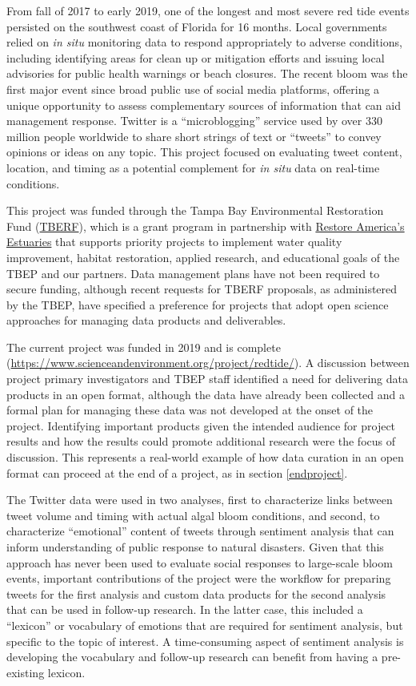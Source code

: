 \documentclass[
]{book}
\begin{document}
From fall of 2017 to early 2019, one of the longest and most severe red tide events persisted on the southwest coast of Florida for 16 months. Local governments relied on \emph{in situ} monitoring data to respond appropriately to adverse conditions, including identifying areas for clean up or mitigation efforts and issuing local advisories for public health warnings or beach closures. The recent bloom was the first major event since broad public use of social media platforms, offering a unique opportunity to assess complementary sources of information that can aid management response. Twitter is a ``microblogging'' service used by over 330 million people worldwide to share short strings of text or ``tweets'' to convey opinions or ideas on any topic. This project focused on evaluating tweet content, location, and timing as a potential complement for \emph{in situ} data on real-time conditions.

This project was funded through the Tampa Bay Environmental Restoration Fund (\href{https://tbep.org/our-work/restoration-research/tberf/}{TBERF}), which is a grant program in partnership with \href{https://estuaries.org/}{Restore America's Estuaries} that supports priority projects to implement water quality improvement, habitat restoration, applied research, and educational goals of the TBEP and our partners. Data management plans have not been required to secure funding, although recent requests for TBERF proposals, as administered by the TBEP, have specified a preference for projects that adopt open science approaches for managing data products and deliverables.

The current project was funded in 2019 and is complete (\url{https://www.scienceandenvironment.org/project/redtide/}). A discussion between project primary investigators and TBEP staff identified a need for delivering data products in an open format, although the data have already been collected and a formal plan for managing these data was not developed at the onset of the project. Identifying important products given the intended audience for project results and how the results could promote additional research were the focus of discussion. This represents a real-world example of how data curation in an open format can proceed at the end of a project, as in section \ref{endproject}.

The Twitter data were used in two analyses, first to characterize links between tweet volume and timing with actual algal bloom conditions, and second, to characterize ``emotional'' content of tweets through sentiment analysis that can inform understanding of public response to natural disasters. Given that this approach has never been used to evaluate social responses to large-scale bloom events, important contributions of the project were the workflow for preparing tweets for the first analysis and custom data products for the second analysis that can be used in follow-up research. In the latter case, this included a ``lexicon'' or vocabulary of emotions that are required for sentiment analysis, but specific to the topic of interest. A time-consuming aspect of sentiment analysis is developing the vocabulary and follow-up research can benefit from having a pre-existing lexicon.
\end{document}
